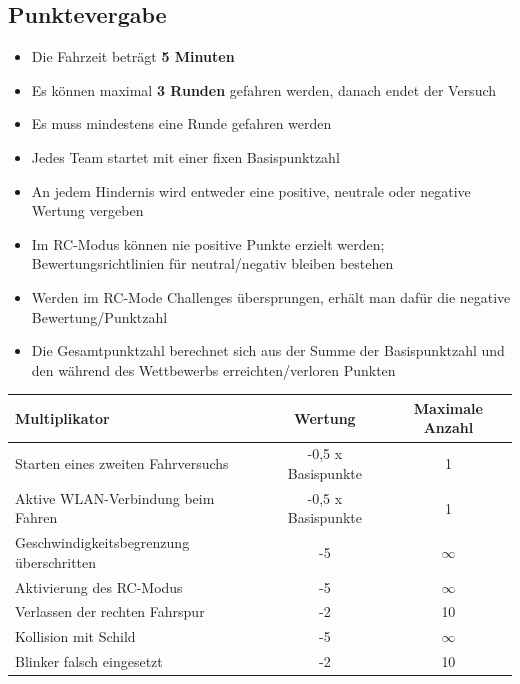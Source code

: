 \documentclass[a4paper, 11pt,usegeometry]{scrartcl}
\begin{document}
\subsection*{Punktevergabe}
\begin{itemize}
  \item Die Fahrzeit beträgt \textbf{5 Minuten}
  \item Es können maximal \textbf{3 Runden} gefahren werden, danach endet der Versuch
  \item Es muss mindestens eine Runde gefahren werden
  \item Jedes Team startet mit einer fixen Basispunktzahl
  \item An jedem Hindernis wird entweder eine positive, neutrale oder negative Wertung vergeben
  \item Im RC-Modus können nie positive Punkte erzielt werden; Bewertungsrichtlinien für
  neutral/negativ bleiben bestehen
  \item Werden im RC-Mode Challenges übersprungen, erhält man dafür die negative Bewertung/Punktzahl
  \item Die Gesamtpunktzahl berechnet sich aus der Summe der Basispunktzahl und den während des Wettbewerbs erreichten/verloren Punkten
\end{itemize}


\begin{table}[H]
\begin{tabular}{|p{}|c|c|}
\hline
\rowcolor[HTML]{CACACA} 
\textbf{Multiplikator}                 & \textbf{Wertung} & \textbf{Maximale Anzahl} \\ \hline
Starten eines zweiten Fahrversuchs     & -0,5 x Basispunkte & 1                      \\ \hline
Aktive WLAN-Verbindung beim Fahren     & -0,5 x Basispunkte & 1                      \\ \hline
Geschwindigkeitsbegrenzung überschritten & -5             & $\infty$                 \\ \hline
Aktivierung des RC-Modus               & -5               & $\infty$                 \\ \hline
Verlassen der rechten Fahrspur         & -2               & 10                       \\ \hline
Kollision mit Schild                   & -5               & $\infty$                 \\ \hline
Blinker falsch eingesetzt              & -2               & 10                       \\ \hline
\end{tabular}
\end{table}
\end{document}
